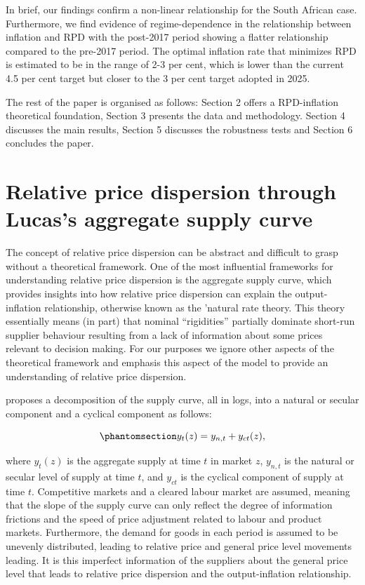 \documentclass[
  letterpaper,
  DIV=11,
  numbers=noendperiod]{scrartcl}
\begin{document}
In brief, our findings confirm a non-linear relationship for the South
African case. Furthermore, we find evidence of regime-dependence in the
relationship between inflation and RPD with the post-2017 period showing
a flatter relationship compared to the pre-2017 period. The optimal
inflation rate that minimizes RPD is estimated to be in the range of 2-3
per cent, which is lower than the current 4.5 per cent target but closer
to the 3 per cent target adopted in 2025.

The rest of the paper is organised as follows: Section 2 offers a
RPD-inflation theoretical foundation, Section 3 presents the data and
methodology. Section 4 discusses the main results, Section 5 discusses
the robustness tests and Section 6 concludes the paper.

\section{Relative price dispersion through Lucas's aggregate supply
curve}\label{relative-price-dispersion-through-lucass-aggregate-supply-curve}

The concept of relative price dispersion can be abstract and difficult
to grasp without a theoretical framework. One of the most influential
frameworks for understanding relative price dispersion is the
\citet{lucas1973} aggregate supply curve, which provides insights into
how relative price dispersion can explain the output-inflation
relationship, otherwise known as the 'natural rate theory. This theory
essentially means (in part) that nominal ``rigidities'' partially
dominate short-run supplier behaviour resulting from a lack of
information about some prices relevant to decision making. For our
purposes we ignore other aspects of the theoretical framework and
emphasis this aspect of the model to provide an understanding of
relative price dispersion.

\citet{lucas1973} proposes a decomposition of the supply curve, all in
logs, into a natural or secular component and a cyclical component as
follows:

\begin{equation}\phantomsection\label{eq-lucas_supply_curve}{y_t(z) = y_{n,t} + y_{ct}(z), }\end{equation}

where \(y_t(z)\) is the aggregate supply at time \(t\) in market \(z\),
\(y_{n,t}\) is the natural or secular level of supply at time \(t\), and
\(y_{ct}\) is the cyclical component of supply at time \(t\).
Competitive markets and a cleared labour market are assumed, meaning
that the slope of the supply curve can only reflect the degree of
information frictions and the speed of price adjustment related to
labour and product markets. Furthermore, the demand for goods in each
period is assumed to be unevenly distributed, leading to relative price
and general price level movements leading. It is this imperfect
information of the suppliers about the general price level that leads to
relative price dispersion and the output-inflation relationship.
\end{document}

